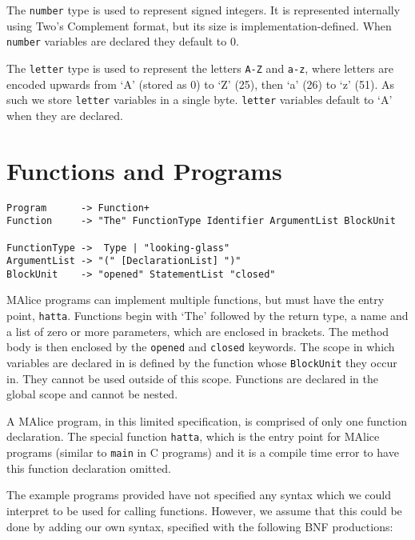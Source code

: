 \documentclass[a4wide, 11pt]{article}
\begin{document}
The \texttt{number} type is used to represent signed integers. It is represented internally using Two's Complement format, but its size is implementation-defined. When \texttt{number} variables are declared they default to 0.

The \texttt{letter} type is used to represent the letters \texttt{A-Z} and \texttt{a-z}, where letters are encoded upwards from `A' (stored as 0) to `Z' (25), then `a' (26) to `z' (51). As such we store \texttt{letter} variables in a single byte. \texttt{letter} variables default to `A' when they are declared.

\section{Functions and Programs}

\begin{verbatim}
Program      -> Function+
Function     -> "The" FunctionType Identifier ArgumentList BlockUnit

FunctionType ->  Type | "looking-glass"
ArgumentList -> "(" [DeclarationList] ")"
BlockUnit    -> "opened" StatementList "closed"
\end{verbatim}

MAlice programs can implement multiple functions, but must have the entry point, \texttt{hatta}. Functions begin with `The' followed by the return type, a name and a list of zero or more parameters, which are enclosed in brackets. The method body is then enclosed by the \texttt{opened} and \texttt{closed} keywords. The scope in which variables are declared in is defined by the function whose \texttt{BlockUnit} they occur in. They cannot be used outside of this scope. Functions are declared in the global scope and cannot be nested. 




A MAlice program, in this limited specification, is comprised of only one function declaration. The special function \texttt{hatta}, which  is the entry point for MAlice programs (similar to \texttt{main} in C programs) and it is a compile time error to have this function declaration omitted.

The example programs provided have not specified any syntax which we could interpret to be used for calling functions. However, we assume that this could be done by adding our own syntax, specified with the following BNF productions:
\end{document}
